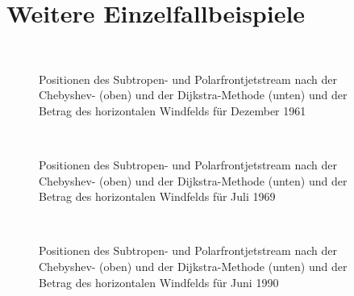 
\appendix
\chapter{Weitere Einzelfallbeispiele} \label{ch:app-case-stud}


\begin{figure}
  \centering
    \begin{minipage}{\textwidth}
  \end{minipage} \\ 
  \begin{minipage}{\textwidth}
  \end{minipage}
  \caption[Vergleich der Chebyshev- und der Dijkstra-Methode für den Dezember 1961]{Positionen des Subtropen- und Polarfrontjetstream nach der Chebyshev- (oben) und der Dijkstra-Methode (unten) und der Betrag des horizontalen Windfelds für Dezember 1961}
\end{figure}


\begin{figure}
  \centering
    \begin{minipage}{\textwidth}
  \end{minipage} \\ 
  \begin{minipage}{\textwidth}
  \end{minipage}
  \caption[Vergleich der Chebyshev- und der Dijkstra-Methode für den Juli 1969]{Positionen des Subtropen- und Polarfrontjetstream nach der Chebyshev- (oben) und der Dijkstra-Methode (unten) und der Betrag des horizontalen Windfelds für Juli 1969}
\end{figure}


\begin{figure}
  \centering
    \begin{minipage}{\textwidth}
  \end{minipage} \\ 
  \begin{minipage}{\textwidth}
  \end{minipage}
  \caption[Vergleich der Chebyshev- und der Dijkstra-Methode für den Juni 1990]{Positionen des Subtropen- und Polarfrontjetstream nach der Chebyshev- (oben) und der Dijkstra-Methode (unten) und der Betrag des horizontalen Windfelds für Juni 1990}
\end{figure}


